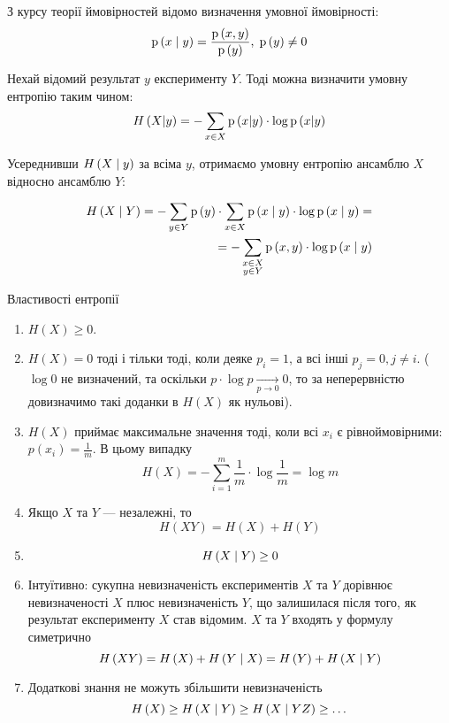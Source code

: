 З курсу теорії ймовірностей відомо визначення умовної ймовірності:
$$\mathrm{p}\left(x \;\middle|\; y\right) = \frac{\mathrm{p}\left(x,y\right)}{\mathrm{p}\left(y\right)},\; \mathrm{p}\left(y\right)\neq 0$$

Нехай відомий результат $y$ експерименту $Y$. Тоді можна визначити умовну
ентропію таким чином:
$$H\left(X|y\right) = -\sum_{x\in X} \mathrm{p}\left(x|y\right) \cdot \log\mathrm{p}\left(x|y\right)$$

Усереднивши  $H\left( X \;\middle|\; y \right)$ за всіма  $y$,
отримаємо умовну ентропію ансамблю $X$ відносно ансамблю $Y$:

\begin{align*}
    H\left( X \;\middle|\; Y \right)
    = - \sum_{y \in Y} \mathrm{p}\left(y\right) \cdot \sum_{x \in X} \mathrm{p}\left(x \;\middle|\; y\right)
            \cdot \log{\mathrm{p}\left(x \;\middle|\;y\right)} = \\
    = - \sum_{\substack{x \in X \\ y \in Y}} \mathrm{p}\left(x, y\right)
            \cdot \log{\mathrm{p}\left(x \;\middle|\;y\right)}
\end{align*}

Властивості ентропії
\begin{enumerate}
    \item  $H\left( X \right) \ge 0$.
    \item  $H(X)=0$ тоді і тільки тоді, коли деяке  $p_i=1$, а всі інші 
        $p_j=0,j\neq i$. ($\log{0}$ не визначений, та оскільки  $p\cdot
        \log{p} \xrightarrow[p \to 0]{} 0$, то за неперервністю
        довизначимо такі доданки в $H\left( X \right)$ як нульові).
    \item $H\left( X \right)$ приймає максимальне значення тоді,
        коли всі $x_i$ є рівноймовірними:
        $p\left( x_i \right) = \frac{1}{m}$. В цьому випадку
        $$H\left( X \right)
            = -\sum_{i=1}^m \frac{1}{m} \cdot \log{\frac{1}{m}}
            =\log{m}$$
    \item Якщо $X$ та $Y$ --- незалежні, то
        $$H\left( XY \right) = H\left( X \right) + H\left( Y \right)$$
    \item $$H\left( X \;\middle|\; Y \right)\ge 0$$
    \item Інтуїтивно: сукупна невизначеність експериментів $X$ та $Y$
        дорівнює невизначеності $X$ плюс невизначеність $Y$, що
        залишилася після того, як результат експерименту $X$ став відомим.
        $X$ та $Y$ входять у формулу симетрично
        $$H\left( XY \right)
            = H\left( X \right)+H\left( Y \;\middle|\; X \right)
            = H\left( Y \right)+H\left( X \;\middle|\; Y \right)$$
    \item Додаткові знання не можуть збільшити невизначеність
        $$H\left( X \right)
            \ge H\left( X \;\middle|\; Y \right)
            \ge H\left( X \;\middle|\; YZ \right)
            \ge \dots$$
\end{enumerate}

